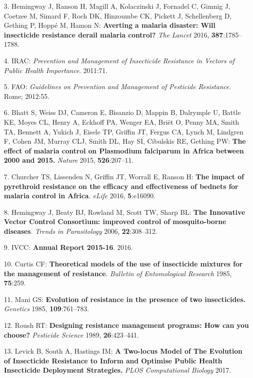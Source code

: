 \documentclass[11pt,]{article}
\begin{document}
\hypertarget{ref-Hemingway2016}{}
3. Hemingway J, Ranson H, Magill A, Kolaczinski J, Fornadel C, Gimnig J,
Coetzee M, Simard F, Roch DK, Hinzoumbe CK, Pickett J, Schellenberg D,
Gething P, Hoppé M, Hamon N: \textbf{Averting a malaria disaster: Will
insecticide resistance derail malaria control?} \emph{The Lancet} 2016,
\textbf{387}:1785--1788.

\hypertarget{ref-IRAC2011}{}
4. IRAC: \emph{Prevention and Management of Insecticide Resistance in
Vectors of Public Health Importance}. 2011:71.

\hypertarget{ref-FAO2012}{}
5. FAO: \emph{Guidelines on Prevention and Management of Pesticide
Resistance}. Rome; 2012:55.

\hypertarget{ref-Bhatt2015}{}
6. Bhatt S, Weiss DJ, Cameron E, Bisanzio D, Mappin B, Dalrymple U,
Battle KE, Moyes CL, Henry A, Eckhoff PA, Wenger EA, Briët O, Penny MA,
Smith TA, Bennett A, Yukich J, Eisele TP, Griffin JT, Fergus CA, Lynch
M, Lindgren F, Cohen JM, Murray CLJ, Smith DL, Hay SI, Cibulskis RE,
Gething PW: \textbf{The effect of malaria control on Plasmodium
falciparum in Africa between 2000 and 2015.} \emph{Nature} 2015,
\textbf{526}:207--11.

\hypertarget{ref-Churcher2016}{}
7. Churcher TS, Lissenden N, Griffin JT, Worrall E, Ranson H:
\textbf{The impact of pyrethroid resistance on the efficacy and
effectiveness of bednets for malaria control in Africa}. \emph{eLife}
2016, \textbf{5}:e16090.

\hypertarget{ref-Hemingway2006}{}
8. Hemingway J, Beaty BJ, Rowland M, Scott TW, Sharp BL: \textbf{The
Innovative Vector Control Consortium: improved control of mosquito-borne
diseases}. \emph{Trends in Parasitology} 2006, \textbf{22}:308--312.

\hypertarget{ref-IVCC2016}{}
9. IVCC: \textbf{Annual Report 2015-16}. 2016.

\hypertarget{ref-Curtis1985}{}
10. Curtis CF: \textbf{Theoretical models of the use of insecticide
mixtures for the management of resistance}. \emph{Bulletin of
Entomological Research} 1985, \textbf{75}:259.

\hypertarget{ref-Mani1985}{}
11. Mani GS: \textbf{Evolution of resistance in the presence of two
insecticides.} \emph{Genetics} 1985, \textbf{109}:761--783.

\hypertarget{ref-Roush1989}{}
12. Roush RT: \textbf{Designing resistance management programs: How can
you choose?} \emph{Pesticide Science} 1989, \textbf{26}:423--441.

\hypertarget{ref-Levick2017}{}
13. Levick B, South A, Hastings IM: \textbf{A Two-locus Model of The
Evolution of Insecticide Resistance to Inform and Optimise Public Health
Insecticide Deployment Strategies.} \emph{PLOS Computational Biology}
2017.
\end{document}
